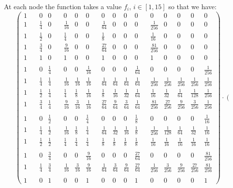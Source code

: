 At each node the function takes a value $f_i$, $i\in[1,15]$ so that we have:
\[
\left(
\begin{array}{lllllllllllllll}
1\quad{} &0 & 0\quad{}& 0  &0&0\quad{} &0 &0&0&0\quad{} &0& 0&0&0&0\\
1 & \frac14&0&\frac{1}{16}&0&0&\frac{1}{64}&0&0&0&\frac{1}{256}&0&0&0&0 \\
1 & \frac12&0&\frac14&0&0&\frac18&0&0&0&\frac{1}{16}&0&0&0&0 \\
1 & \frac34&0&\frac{9}{16}&0&0&\frac{27}{64}&0&0&0&\frac{81}{256}&0&0&0&0 \\ 
1 &1&0&1&0&0&1&0&0&0&1&0&0&0&0 \\ \\
1 &0&\frac14&0&0&\frac{1}{16}&0&0&0&\frac{1}{64}&0&0&0&0&\frac{1}{256} \\
1 &\frac14&\frac14&\frac{1}{16}&\frac{1}{16}&\frac{1}{16}&\frac{1}{64}&\frac{1}{64}&\frac{1}{64}&\frac{1}{64}&\frac{1}{256}&\frac{1}{256}&\frac{1}{256}&\frac{1}{256}&\frac{1}{256} \\
1 &\frac12&\frac14&\frac14&\frac18&\frac{1}{16}&\frac18&\frac{1}{16}&\frac{1}{32}&\frac{1}{64}&\frac{1}{16}&\frac{1}{32}&\frac{1}{64}&\frac{1}{128}&\frac{1}{256} \\
1 &\frac34&\frac14&\frac{9}{16}&\frac{3}{16}&\frac{1}{16}&\frac{27}{64}&\frac{9}{64}&\frac{3}{64}&\frac{1}{64}&\frac{81}{256}&\frac{27}{256}&\frac{9}{256}&\frac{3}{256}&\frac{1}{256} \\
\\
1 &0&\frac12&0&0&\frac14&0&0&0&\frac18&0&0&0&0&\frac{1}{16} \\
1 &\frac14&\frac12&\frac{1}{16}&\frac{1}{8}&\frac{1}{4}&\frac{1}{64}&\frac{1}{32}&\frac{1}{16}&\frac{1}{8}&\frac{1}{256}&\frac{1}{128}&\frac{1}{64}&\frac{1}{32}&\frac{1}{16} \\
1 &\frac12&\frac12&\frac14&\frac14&\frac14&\frac{1}{8}&\frac{1}{8}&\frac{1}{8}&\frac{1}{8}&\frac{1}{16}&\frac{1}{16}&\frac{1}{16}&\frac{1}{16}&\frac{1}{16} \\ \\
1 &0&\frac34&0&0&\frac{9}{16}&0&0&0&\frac{27}{64}&0&0&0&0&\frac{81}{256} \\
1 &\frac14&\frac34&\frac{1}{16}&\frac{3}{16}&\frac{9}{16}&\frac{1}{64}&\frac{3}{64}&\frac{9}{64}&\frac{27}{64}&\frac{1}{256}&\frac{3}{256}&\frac{9}{256}&\frac{27}{256}&\frac{81}{256} \\ \\
1 &0&1&0&0&1&0&0&0&1&0&0&0&0&1 
\end{array}
\right)
\cdot
\left(
\begin{array}{c}

\end{array}\]
